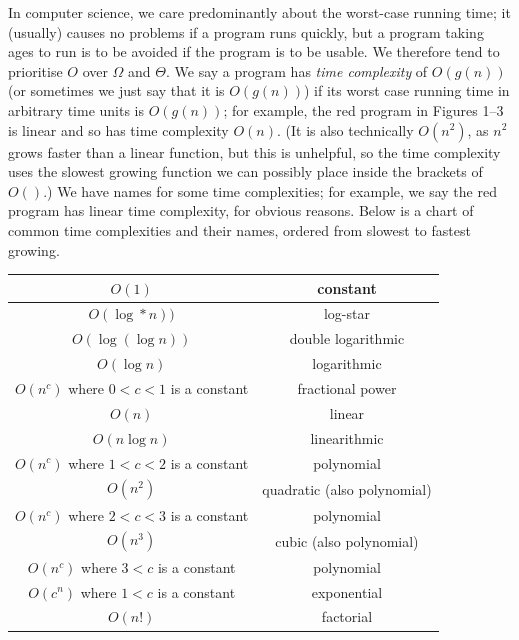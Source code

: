 \documentclass[12pt,a4paper]{report}
\begin{document}
\begin{multicols}{2}
In computer science, we care predominantly about the worst-case running time; it (usually) causes no problems if a program runs quickly, but a program taking ages to run is to be avoided if the program is to be usable. We therefore tend to prioritise \(O\) over \(\Omega\) and \(\Theta\). We say a program has \textit{time complexity} of \(O(g(n))\) (or sometimes we just say that it is \(O(g(n))\)) if its worst case running time in arbitrary time units is \(O(g(n))\); for example, the red program in Figures 1--3 is linear and so has time complexity \(O(n)\). (It is also technically \(O(n^2)\), as \(n^2\) grows faster than a linear function, but this is unhelpful, so the time complexity uses the slowest growing function we can possibly place inside the brackets of \(O()\).) We have names for some time complexities; for example, we say the red program has linear time complexity, for obvious reasons. Below is a chart of common time complexities and their names, ordered from slowest to fastest growing.

\end{multicols}

\begin{center}
	\begin{tabular}{c|c}
		\(O(1)\)&constant\\\hline
		\(O(\log*n))\)&log-star\footnotemark\\\hline
		\(O(\log(\log{}n))\)&double logarithmic\\\hline
		\(O(\log{}n)\)&logarithmic\\\hline
		\(O(n^c)\) where \(0<c<1\) is a constant&fractional power\\\hline
		\(O(n)\)&linear\\\hline
		\(O(n\log{}n)\)&linearithmic\\\hline
		\(O(n^c)\) where \(1<c<2\) is a constant&polynomial\\\hline
		\(O(n^2)\)&quadratic (also polynomial)\\\hline
		\(O(n^c)\) where \(2<c<3\) is a constant&polynomial\\\hline
		\(O(n^3)\)&cubic (also polynomial)\\\hline
		\(O(n^c)\) where \(3<c\) is a constant&polynomial\\\hline
		\(O(c^n)\) where \(1<c\) is a constant&exponential\\\hline
		\(O(n!)\)&factorial
	\end{tabular}
\end{center}
\end{document}
